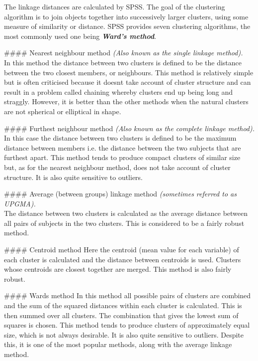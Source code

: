 The linkage distances are calculated by SPSS. The goal of the clustering algorithm is to join objects together into successively larger clusters, using some measure of similarity or distance. SPSS provides seven clustering algorithms, the most commonly used one being  \textbf{\textit{Ward's method}}.


#### {Nearest neighbour method} \textit{
(Also known as the single linkage method).\\}
In this method the distance between two clusters is defined to be the distance between
the two closest members, or neighbours. This method is relatively simple but is often
criticised because it doesnt take account of cluster structure and can result in a problem
called chaining whereby clusters end up being long and straggly. However, it is better
than the other methods when the natural clusters are not spherical or elliptical in shape.

#### {Furthest neighbour method}\textit{
(Also known as the complete linkage method).\\}
In this case the distance between two clusters is defined to be the maximum distance
between members  i.e. the distance between the two subjects that are furthest apart.
This method tends to produce compact clusters of similar size but, as for the nearest
neighbour method, does not take account of cluster structure. It is also quite sensitive
to outliers.

#### {Average (between groups) linkage method }
\textit{(sometimes referred to as UPGMA).}\\
The distance between two clusters is calculated as the average distance between all pairs
of subjects in the two clusters. This is considered to be a fairly robust method.

#### {Centroid method}
Here the centroid (mean value for each variable) of each cluster is calculated and the
distance between centroids is used. Clusters whose centroids are closest together are
merged. This method is also fairly robust.

#### {Wards method}
In this method all possible pairs of clusters are combined and the sum of the squared
distances within each cluster is calculated. This is then summed over all clusters. The
combination that gives the lowest sum of squares is chosen. This method tends to
produce clusters of approximately equal size, which is not always desirable. It is also
quite sensitive to outliers. Despite this, it is one of the most popular methods, along
with the average linkage method.

